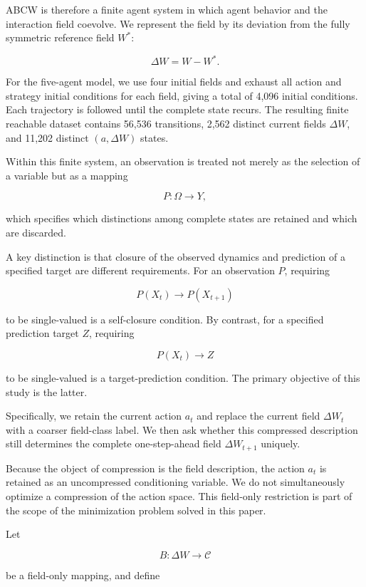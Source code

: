 \documentclass[
  11pt,
]{article}
\begin{document}
ABCW is therefore a finite agent system in which agent behavior and the
interaction field coevolve. We represent the field by its deviation from
the fully symmetric reference field \({W^\ast}\):

\[{\Delta W=W-W^\ast.}\]

For the five-agent model, we use four initial fields and exhaust all
action and strategy initial conditions for each field, giving a total of
4,096 initial conditions. Each trajectory is followed until the complete
state recurs. The resulting finite reachable dataset contains 56,536
transitions, 2,562 distinct current fields \({\Delta W}\), and 11,202
distinct \({(a,\Delta W)}\) states.

Within this finite system, an observation is treated not merely as the
selection of a variable but as a mapping

\[{P:\Omega\longrightarrow Y,}\]

which specifies which distinctions among complete states are retained
and which are discarded.

A key distinction is that closure of the observed dynamics and
prediction of a specified target are different requirements. For an
observation \({P}\), requiring

\[{P(X_t)\longrightarrow P(X_{t+1})}\]

to be single-valued is a self-closure condition. By contrast, for a
specified prediction target \({Z}\), requiring

\[{P(X_t)\longrightarrow Z}\]

to be single-valued is a target-prediction condition. The primary
objective of this study is the latter.

Specifically, we retain the current action \({a_t}\) and replace the
current field \({\Delta W_t}\) with a coarser field-class label. We then
ask whether this compressed description still determines the complete
one-step-ahead field \({\Delta W_{t+1}}\) uniquely.

Because the object of compression is the field description, the action
\({a_t}\) is retained as an uncompressed conditioning variable. We do
not simultaneously optimize a compression of the action space. This
field-only restriction is part of the scope of the minimization problem
solved in this paper.

Let

\[{B:\Delta W\longrightarrow\mathcal C}\]

be a field-only mapping, and define
\end{document}
